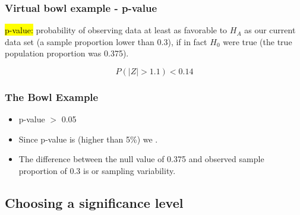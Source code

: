 \documentclass[notes,11pt, aspectratio=169]{beamer}
\begin{document}

\begin{frame}
\frametitle{Virtual bowl example - p-value}

\hl{p-value:} probability of observing data at least as favorable to $H_A$ as our current data set (a sample proportion lower than 0.3), if in fact $H_0$ were true (the true population proportion was 0.375).

\pause

\[ P(|Z| > 1.1) < 0.14 \]

\end{frame}


\begin{frame}
\frametitle{The Bowl Example}

\begin{itemize}

\item p-value $>$ 0.05

\pause


\pause
\item Since p-value is  (higher than 5\%) we .


\pause
\item The difference between the null value of 0.375 and observed sample proportion of 0.3 is  or sampling variability.

\end{itemize}

\end{frame}


\subsection{Choosing a significance level}

\end{document}

